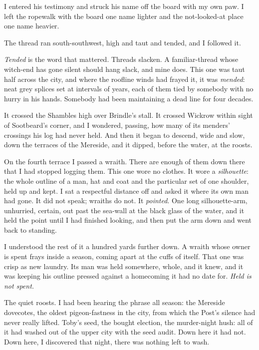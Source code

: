 I entered his testimony and struck his name off the board with my own paw. I left the ropewalk with the board one name lighter and the not-looked-at place one name heavier.

\scenebreak

The thread ran south-southwest, high and taut and tended, and I followed it.

\emph{Tended} is the word that mattered. Threads slacken. A familiar-thread whose witch-end has gone silent should hang slack, and mine does. This one was taut half across the city, and where the roofline winds had frayed it, it was \emph{mended}: neat grey splices set at intervals of years, each of them tied by somebody with no hurry in his hands. Somebody had been maintaining a dead line for four decades.

It crossed the Shambles high over Brindle's stall. It crossed Wickrow within sight of Sootbeard's corner, and I wondered, passing, how many of its menders' crossings his log had never held. And then it began to descend, wide and slow, down the terraces of the Mereside, and it dipped, before the water, at the roosts.

On the fourth terrace I passed a wraith. There are enough of them down there that I had stopped logging them. This one wore no clothes. It wore a \emph{silhouette}: the whole outline of a man, hat and coat and the particular set of one shoulder, held up and kept. I sat a respectful distance off and asked it where its own man had gone. It did not speak; wraiths do not. It \emph{pointed}. One long silhouette-arm, unhurried, certain, out past the sea-wall at the black glass of the water, and it held the point until I had finished looking, and then put the arm down and went back to standing.

I understood the rest of it a hundred yards further down. A wraith whose owner is spent frays inside a season, coming apart at the cuffs of itself. That one was crisp as new laundry. Its man was held somewhere, whole, and it knew, and it was keeping his outline pressed against a homecoming it had no date for. \emph{Held is not spent.}

The quiet roosts. I had been hearing the phrase all season: the Mereside dovecotes, the oldest pigeon-fastness in the city, from which the Post's silence had never really lifted. Toby's seed, the bought election, the murder-night hush: all of it had washed out of the upper city with the seed audit. Down here it had not. Down here, I discovered that night, there was nothing left to wash.

